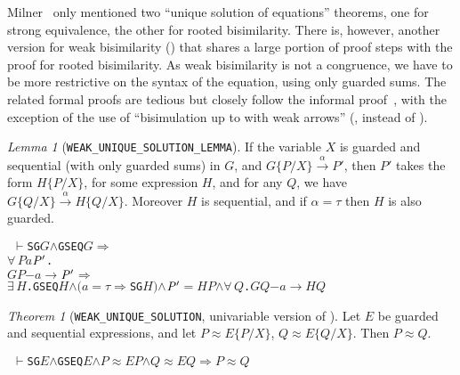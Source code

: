 \documentclass[GCNS]{yincog}
\renewcommand{\HOLConst}[1]{\texttt{#1}}
\renewcommand{\HOLBoundVar}[1]{\ensuremath{\mathit{#1}}}
\renewcommand{\HOLFreeVar}[1]{\ensuremath{\mathit{#1}}}
\renewcommand{\HOLSymConst}[1]{#1}
\renewcommand{\HOLTokenConj}{\ensuremath{\wedge}}
\renewcommand{\HOLTokenExists}{\ensuremath{\exists \,}}
\renewcommand{\HOLTokenForall}{\ensuremath{\forall \,}}
\renewcommand{\HOLTokenTurnstile}{\ensuremath{\:\:\vdash}}
\theoremstyle{remark}
\theoremstyle{theorem}
\newtheorem{lemma}[definition]{Lemma}
\newtheorem{theorem}[definition]{Theorem}
\theoremstyle{remark}
\newcommand{\HOLTokenWeakEQ}{$\approx$}
\newcommand{\HOLTokenTransBegin}{$-$}
\newcommand{\HOLTokenTransEnd}{$\rightarrow$\xspace}
\renewcommand{\HOLTokenImp}{\ensuremath{\Longrightarrow}}
\newcommand{\univariate}{univariable\xspace}
\newcommand{\wbvtex}{\approx}
\begin{document}
Milner~\cite{Mil89} only mentioned two ``unique solution of equations''
theorems, one for strong equivalence, the other for rooted bisimilarity.
There is, however, another version for weak bisimilarity ()
that shares a large portion of proof steps with the proof for rooted bisimilarity.
As weak bisimilarity is not a congruence, we have to be more restrictive
on the syntax of the equation, using only guarded sums. The related formal
proofs are tedious but closely follow the informal proof~\citep[p.~158--159]{Mil89},
with the exception of the use of ``bisimulation up to with weak arrows''
(, instead of ).

\begin{lemma}[\texttt{WEAK\_UNIQUE\_SOLUTION\_LEMMA}]
If the variable $X$ is guarded and sequential (with only guarded sums)
in $G$, and $G\{P/X\}\overset{\alpha}{\rightarrow} P'$, then $P'$ takes
the form $H\{P/X\}$, for some expression $H$, and for any $Q$, we have
$G\{Q/X\}\overset{\alpha}{\rightarrow} H\{Q/X\}$. Moreover $H$ is sequential,
and if $\alpha = \tau $ then $H$ is also guarded.
%
\begin{alltt}
\HOLTokenTurnstile{} \HOLConst{SG} \HOLFreeVar{G} \HOLSymConst{\HOLTokenConj{}} \HOLConst{GSEQ} \HOLFreeVar{G} \HOLSymConst{\HOLTokenImp{}}
   \HOLSymConst{\HOLTokenForall{}}\HOLBoundVar{P} \HOLBoundVar{a} \ensuremath{\HOLBoundVar{P}\sp{\prime}}.
       \HOLFreeVar{G} \HOLBoundVar{P} \HOLTokenTransBegin\HOLBoundVar{a}\HOLTokenTransEnd \ensuremath{\HOLBoundVar{P}\sp{\prime}} \HOLSymConst{\HOLTokenImp{}}
       \HOLSymConst{\HOLTokenExists{}}\HOLBoundVar{H}. \HOLConst{GSEQ} \HOLBoundVar{H} \HOLSymConst{\HOLTokenConj{}} \ensuremath{(}\HOLBoundVar{a} \HOLSymConst{\ensuremath{=}} \HOLSymConst{\ensuremath{\tau}} \HOLSymConst{\HOLTokenImp{}} \HOLConst{SG} \HOLBoundVar{H}\ensuremath{)} \HOLSymConst{\HOLTokenConj{}} \ensuremath{\HOLBoundVar{P}\sp{\prime}} \HOLSymConst{\ensuremath{=}} \HOLBoundVar{H} \HOLBoundVar{P} \HOLSymConst{\HOLTokenConj{}} \HOLSymConst{\HOLTokenForall{}}\HOLBoundVar{Q}. \HOLFreeVar{G} \HOLBoundVar{Q} \HOLTokenTransBegin\HOLBoundVar{a}\HOLTokenTransEnd \HOLBoundVar{H} \HOLBoundVar{Q}
\end{alltt}
%
\end{lemma}

\begin{theorem}[\texttt{WEAK\_UNIQUE\_SOLUTION}, \univariate version of
]
 \label{thm:Mil89f}
Let $E$ be guarded and sequential expressions, and let
$P \wbvtex E\{P/X\}$, $Q \wbvtex E\{Q/X\}$. Then $P \wbvtex Q$.
%
\begin{alltt}
\HOLTokenTurnstile{} \HOLConst{SG} \HOLFreeVar{E} \HOLSymConst{\HOLTokenConj{}} \HOLConst{GSEQ} \HOLFreeVar{E} \HOLSymConst{\HOLTokenConj{}} \HOLFreeVar{P} \HOLSymConst{\HOLTokenWeakEQ} \HOLFreeVar{E} \HOLFreeVar{P} \HOLSymConst{\HOLTokenConj{}} \HOLFreeVar{Q} \HOLSymConst{\HOLTokenWeakEQ} \HOLFreeVar{E} \HOLFreeVar{Q} \HOLSymConst{\HOLTokenImp{}} \HOLFreeVar{P} \HOLSymConst{\HOLTokenWeakEQ} \HOLFreeVar{Q}
\end{alltt}
%
\end{theorem}
\end{document}
